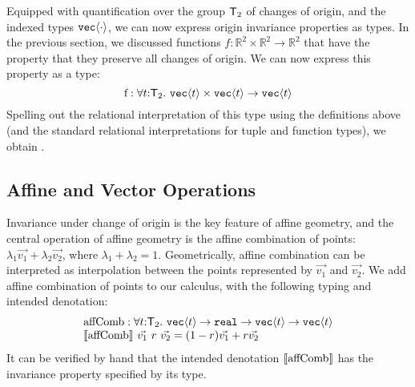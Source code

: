 Equipped with quantification over the group $\mathsf{T}_2$ of changes
of origin, and the indexed types $\texttt{vec}\langle \cdot \rangle$, we can now
express origin invariance properties as types. In the previous
section, we discussed functions $f : \mathbb{R}^2 \times \mathbb{R}^2
\to \mathbb{R}^2$ that have the property that they preserve all
changes of origin. We can now express this property as a type:
\begin{displaymath}
  \mathrm{f} : \forall t \mathord: \mathsf{T}_2.\ \texttt{vec}\langle t \rangle \times \texttt{vec}\langle t \rangle \to \texttt{vec}\langle t \rangle
\end{displaymath}
Spelling out the relational interpretation of this type using the
definitions above (and the standard relational interpretations for
tuple and function types), we obtain
.

\subsection{Affine and Vector Operations}
\label{sec:affine-vector-ops}

Invariance under change of origin is the key feature of affine
geometry, and the central operation of affine geometry is the affine
combination of points: $\lambda_1\vec{v_1} + \lambda_2\vec{v_2}$,
where $\lambda_1 + \lambda_2 = 1$. Geometrically, affine combination
can be interpreted as interpolation between the points represented by
$\vec{v_1}$ and $\vec{v_2}$. We add affine combination of points to
our calculus, with the following typing and intended denotation:
\begin{displaymath}
  \begin{array}{l}
    \mathrm{affComb} :\forall t \mathord: \mathsf{T}_2.\ \texttt{vec}\langle t \rangle \to \texttt{real} \to \texttt{vec}\langle t \rangle \to \texttt{vec}\langle t \rangle \\
    \llbracket \mathrm{affComb} \rrbracket\ \vec{v_1}\ r\ \vec{v_2} = (1-r)\vec{v_1} + r\vec{v_2}
  \end{array}
\end{displaymath}
It can be verified by hand that the intended denotation
$\llbracket \mathrm{affComb} \rrbracket$ has the invariance property specified by its
type.

